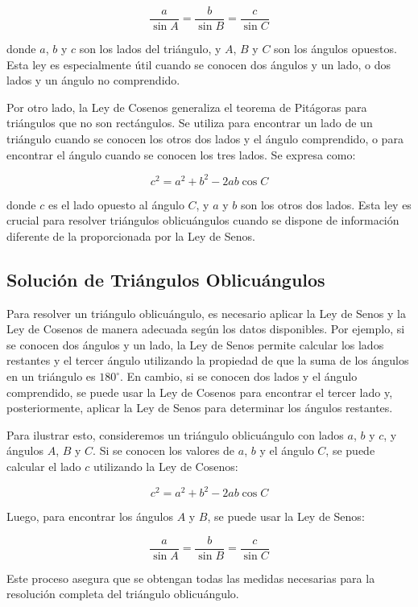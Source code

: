 \[
\frac{a}{\sin A} = \frac{b}{\sin B} = \frac{c}{\sin C}
\]

donde \(a\), \(b\) y \(c\) son los lados del triángulo, y \(A\), \(B\) y \(C\) son los ángulos opuestos. Esta ley es especialmente útil cuando se conocen dos ángulos y un lado, o dos lados y un ángulo no comprendido.

Por otro lado, la Ley de Cosenos generaliza el teorema de Pitágoras para triángulos que no son rectángulos. Se utiliza para encontrar un lado de un triángulo cuando se conocen los otros dos lados y el ángulo comprendido, o para encontrar el ángulo cuando se conocen los tres lados. Se expresa como:

\[
c^2 = a^2 + b^2 - 2ab \cos C
\]

donde \(c\) es el lado opuesto al ángulo \(C\), y \(a\) y \(b\) son los otros dos lados. Esta ley es crucial para resolver triángulos oblicuángulos cuando se dispone de información diferente de la proporcionada por la Ley de Senos.

\subsection{Solución de Triángulos Oblicuángulos}

Para resolver un triángulo oblicuángulo, es necesario aplicar la Ley de Senos y la Ley de Cosenos de manera adecuada según los datos disponibles. Por ejemplo, si se conocen dos ángulos y un lado, la Ley de Senos permite calcular los lados restantes y el tercer ángulo utilizando la propiedad de que la suma de los ángulos en un triángulo es \(180^\circ\). En cambio, si se conocen dos lados y el ángulo comprendido, se puede usar la Ley de Cosenos para encontrar el tercer lado y, posteriormente, aplicar la Ley de Senos para determinar los ángulos restantes.

Para ilustrar esto, consideremos un triángulo oblicuángulo con lados \(a\), \(b\) y \(c\), y ángulos \(A\), \(B\) y \(C\). Si se conocen los valores de \(a\), \(b\) y el ángulo \(C\), se puede calcular el lado \(c\) utilizando la Ley de Cosenos:

\[
c^2 = a^2 + b^2 - 2ab \cos C
\]

Luego, para encontrar los ángulos \(A\) y \(B\), se puede usar la Ley de Senos:

\[
\frac{a}{\sin A} = \frac{b}{\sin B} = \frac{c}{\sin C}
\]

Este proceso asegura que se obtengan todas las medidas necesarias para la resolución completa del triángulo oblicuángulo.

